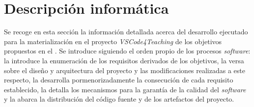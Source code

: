 \chapter{Descripción informática}
\label{cap:descInformatica}

Se recoge en esta sección la información detallada acerca del desarrollo ejecutado para la materialización en el proyecto \textit{VSCode4Teaching} de los objetivos propuestos en el . Se introduce siguiendo el orden propio de los procesos \textit{software}: la  introduce la enumeración de los requisitos derivados de los objetivos, la  versa sobre el diseño y arquitectura del proyecto y las modificaciones realizadas a este respecto, la  desarrolla pormenorizadamente la consecución de cada requisito establecido, la  detalla los mecanismos para la garantía de la calidad del \textit{software} y la  abarca la distribución del código fuente y de los artefactos del proyecto.







